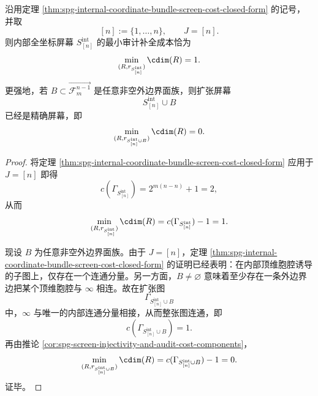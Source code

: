 \begin{corollary}[内部全坐标屏幕的唯一缺口与任意外边界闭合]\label{cor:spg-full-internal-screen-one-defect-boundary-closure}
沿用定理 \ref{thm:spg-internal-coordinate-bundle-screen-cost-closed-form} 的记号，并取
\[
[n]:=\{1,\dots,n\},
\qquad
J=[n].
\]
则内部全坐标屏幕 \(S_{[n]}^{\mathrm{int}}\) 的最小审计补全成本恰为
\[
\min_{(R,r_{S_{[n]}^{\mathrm{int}}})}\cdim(R)=1.
\]
更强地，若 \(B\subset \overrightarrow{\mathcal F_m^{n-1}}\) 是任意非空外边界面族，则扩张屏幕
\[
S_{[n]}^{\mathrm{int}}\cup B
\]
已经是精确屏幕，即
\[
\min_{(R,r_{S_{[n]}^{\mathrm{int}}\cup B})}\cdim(R)=0.
\]
\end{corollary}
\begin{proof}
将定理 \ref{thm:spg-internal-coordinate-bundle-screen-cost-closed-form} 应用于 \(J=[n]\) 即得
\[
c(\Gamma_{S_{[n]}^{\mathrm{int}}})=2^{m(n-n)}+1=2,
\]
从而
\[
\min_{(R,r_{S_{[n]}^{\mathrm{int}}})}\cdim(R)=c(\Gamma_{S_{[n]}^{\mathrm{int}}})-1=1.
\]

现设 \(B\) 为任意非空外边界面族。由于 \(J=[n]\)，定理
\ref{thm:spg-internal-coordinate-bundle-screen-cost-closed-form}
的证明已经表明：在内部顶维胞腔诱导的子图上，仅存在一个连通分量。另一方面，\(B\neq\varnothing\) 意味着至少存在一条外边界边把某个顶维胞腔与 \(\infty\) 相连。故在扩张图
\[
\Gamma_{S_{[n]}^{\mathrm{int}}\cup B}
\]
中，\(\infty\) 与唯一的内部连通分量相接，从而整张图连通，即
\[
c(\Gamma_{S_{[n]}^{\mathrm{int}}\cup B})=1.
\]
再由推论 \ref{cor:spg-screen-injectivity-and-audit-cost-components}，
\[
\min_{(R,r_{S_{[n]}^{\mathrm{int}}\cup B})}\cdim(R)
=
c(\Gamma_{S_{[n]}^{\mathrm{int}}\cup B})-1
=0.
\]
证毕。
\end{proof}

